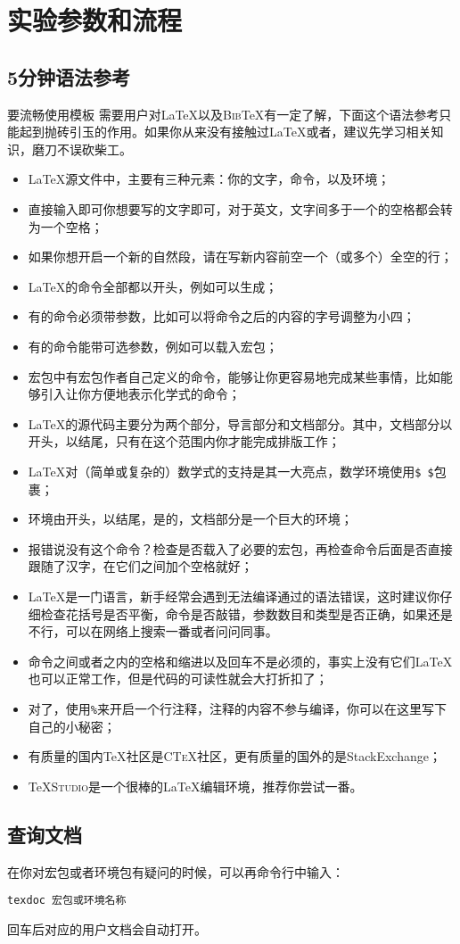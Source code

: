 \chapter{实验参数和流程}
\section{5分钟语法参考}

{\kaishu 要流畅使用模板 需要用户对\LaTeX 以及\textsc{Bib}\TeX 有一定了解，下面这个语法参考只能起到抛砖引玉的作用。如果你从来没有接触过\LaTeX 或者\XeTeX ，建议先学习相关知识，磨刀不误砍柴工。}
\medskip
\begin{itemize}
	\item \LaTeX 源文件中，主要有三种元素：你的文字，命令，以及环境；
	\item 直接输入即可你想要写的文字即可，对于英文，文字间多于一个的空格都会转为一个空格；
	\item 如果你想开启一个新的自然段，请在写新内容前空一个（或多个）全空的行；
	\item \LaTeX 的命令{\heiti 全部}都以\cs{ }开头，例如可以生成\XeTeX ；
	\item 有的命令{\heiti 必须}带参数，比如可以将命令之后的内容的字号调整为小四；
	\item 有的命令能带可选参数，例如可以载入宏包；
	\item 宏包中有宏包作者自己定义的命令，能够让你更容易地完成某些事情，比如能够引入让你方便地表示化学式的命令；
	\item \LaTeX 的源代码主要分为两个部分，导言部分和文档部分。其中，文档部分以开头，以结尾，只有在这个范围内你才能完成排版工作；
	\item \LaTeX 对（简单或复杂的）数学式的支持是其一大亮点，数学环境使用\texttt{\${ }\$}包裹；
	\item 环境由开头，以结尾，是的，文档部分是一个巨大的环境；
	\item 报错说没有这个命令？检查是否载入了必要的宏包，再检查命令后面是否直接跟随了汉字，在它们之间加个空格就好；
	\item \LaTeX 是一门语言，新手经常会遇到无法编译通过的语法错误，这时建议你仔细检查花括号是否平衡，命令是否敲错，参数数目和类型是否正确，如果还是不行，可以在网络上搜索一番或者问问同事。
	\item 命令之间或者之内的空格和缩进以及回车不是必须的，事实上没有它们\LaTeX 也可以正常工作，但是代码的可读性就会大打折扣了；
	\item 对了，使用\texttt{\%}来开启一个行注释，注释的内容不参与编译，你可以在这里写下自己的小秘密；
	\item 有质量的国内\TeX 社区是\textsc{CTeX}社区，更有质量的国外的是\textsf{StackExchange}；
	\item \TeX\textsc{Studio}是一个很棒的\LaTeX 编辑环境，推荐你尝试一番。
\end{itemize}

\section{查询文档}
在你对宏包或者环境包有疑问的时候，可以再命令行中输入：

\texttt{texdoc 宏包或环境名称}

回车后对应的用户文档会自动打开。





